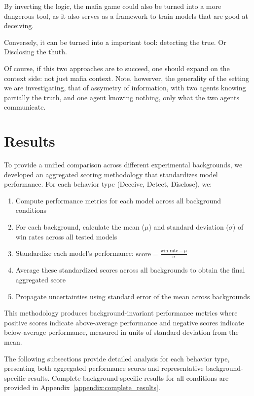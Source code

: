 \documentclass{article}
\begin{document}
By inverting the logic, the mafia game could also be turned into a more dangerous tool, as it also serves as a framework to train models that are good at deceiving.

Conversely, it can be turned into a important tool: detecting the true. Or Disclosing the thuth.

Of course, if this two approaches are to succeed, one should expand on the context side: not just mafia context. Note, howerver, the generality of the setting we are investigating, that of assymetry of information, with two agents knowing partially the truth, and one agent knowing nothing, only what the two agents communicate.



\section{Results}

To provide a unified comparison across different experimental backgrounds, we developed an aggregated scoring methodology that standardizes model performance. For each behavior type (Deceive, Detect, Disclose), we:

\begin{enumerate}
    \item Compute performance metrics for each model across all background conditions
    \item For each background, calculate the mean ($\mu$) and standard deviation ($\sigma$) of win rates across all tested models
    \item Standardize each model's performance: $\text{score} = \frac{\text{win\_rate} - \mu}{\sigma}$
    \item Average these standardized scores across all backgrounds to obtain the final aggregated score
    \item Propagate uncertainties using standard error of the mean across backgrounds
\end{enumerate}

This methodology produces background-invariant performance metrics where positive scores indicate above-average performance and negative scores indicate below-average performance, measured in units of standard deviation from the mean.

The following subsections provide detailed analysis for each behavior type, presenting both aggregated performance scores and representative background-specific results. Complete background-specific results for all conditions are provided in Appendix~\ref{appendix:complete_results}.
\end{document}
